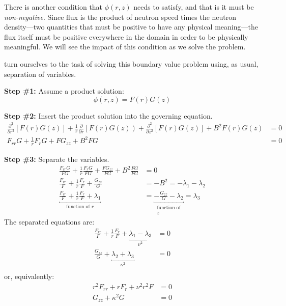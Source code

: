 There is another condition that $\phi(r,z)$ needs to satisfy, and that is it must be \emph{non-negative}.  Since flux is the product of neutron speed times the neutron density---two quantities that must be positive to have any physical meaning---the flux itself must be positive everywhere in the domain in order to be physically meaningful.  We will see the impact of this condition as we solve the problem.

 turn ourselves to the task of solving this boundary value problem using, as usual, separation of variables.

\vspace{0.25cm}

\noindent\textbf{Step \#1:} Assume a product solution:
\begin{equation*}
\phi(r,z) = F(r)G(z)
\end{equation*}

\vspace{0.25cm}

\noindent\textbf{Step \#2:} Insert the product solution into the governing equation.
\begin{align*}
\frac{\partial^2}{\partial r^2}\left[F(r)G(z)\right] + \frac{1}{r}\frac{\partial}{\partial r}\left[F(r)G(z)\right) + \frac{\partial^2}{\partial z^2}\left[F(r)G(z)\right] + B^2F(r)G(z) &= 0 \\
F_{rr}G + \frac{1}{r}F_rG + FG_{zz} + B^2FG &= 0
\end{align*}

\vspace{0.25cm}

\noindent\textbf{Step \#3:} Separate the variables.
\begin{align*}
\frac{F_{rr}G}{FG} + \frac{1}{r}\frac{F_r G}{FG} + \frac{FG_{zz}}{FG} + B^2\frac{FG}{FG} &= 0 \\
\frac{F_{rr}}{F} + \frac{1}{r}\frac{F_r}{F} + \frac{G_{zz}}{G} &= -B^2 = -\lambda_1 -\lambda_2 \\
\underbracket{\frac{F_{rr}}{F} + \frac{1}{r}\frac{F_r}{F} + \lambda_1}_{\text{function of }r} &= \underbracket{-\frac{G_{zz}}{G} - \lambda_2}_{\substack{\text{function of} \\ z}} = \lambda_3 
\end{align*}
 The separated equations are:
\begin{align*}
\frac{F_{rr}}{F} + \frac{1}{r}\frac{F_r}{F} + \underbracket{\lambda_1 - \lambda_3}_{\nu^2} &= 0 \\
\frac{G_{zz}}{G} + \underbracket{\lambda_2 + \lambda_3}_{\kappa^2} &= 0 \\
\end{align*}
or, equivalently:
\begin{align*}
r^2F_{rr} + rF_{r} + \nu^2r^2F &= 0 \\
G_{zz} + \kappa^2G &= 0
\end{align*}

